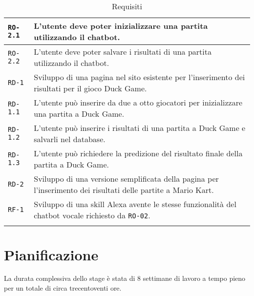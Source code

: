 \begin{center}
\begin{longtable}{| C{3cm} | L{8.7cm} |}
		\hline 
		
		\texttt{RO-2.1} & L'utente deve poter inizializzare una partita utilizzando il \gls{chatbot}. \\
		
		\hline 
		
		\texttt{RO-2.2} & L'utente deve poter salvare i risultati di una partita utilizzando il \gls{chatbot}. \\
		
		\hline
		
		\texttt{RD-1} & Sviluppo di una pagina nel sito esistente per l'inserimento dei risultati per il gioco Duck Game. \\
			
		\hline 
		
		\texttt{RD-1.1} & L'utente può inserire da due a otto giocatori per inizializzare una partita a Duck Game. \\
		
		\hline 
		
		\texttt{RD-1.2} & L'utente può inserire i risultati di una partita a Duck Game e salvarli nel database. \\
		
		\hline 
		
		\texttt{RD-1.3} & L'utente può richiedere la predizione del risultato finale della partita a Duck Game. \\	
			
		\hline 
		
		\texttt{RD-2} & Sviluppo di una versione semplificata della pagina per l'inserimento dei risultati delle 
		partite a Mario Kart. \\
		
		\hline 
		
		\texttt{RF-1} & Sviluppo di una \gls{skill} Alexa avente le stesse funzionalità del \gls{chatbot} vocale 
		richiesto da \texttt{RO-02}. \\
		
		\hline 
		
		\caption{Requisiti}\label{tab:requisiti}
	\end{longtable}
	
	
\end{center}

\section{Pianificazione}
La durata complessiva dello stage è stata di 8 settimane di lavoro a tempo pieno per un totale di circa trecentoventi ore. \\

